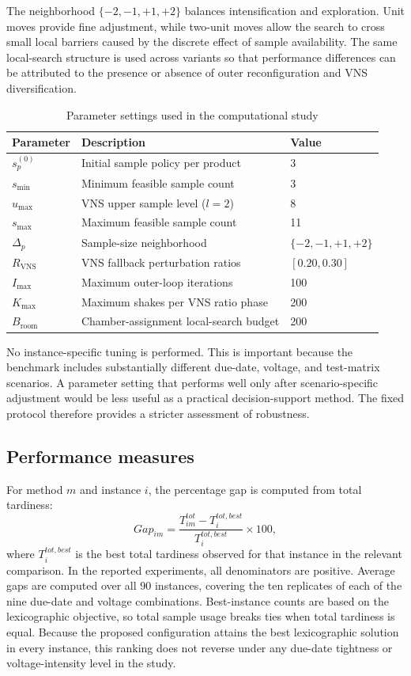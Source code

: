 \documentclass[11pt]{article}
\begin{document}
The neighborhood \(\{-2,-1,+1,+2\}\) balances intensification and exploration. Unit moves provide fine adjustment, while two-unit moves allow the search to cross small local barriers caused by the discrete effect of sample availability. The same local-search structure is used across variants so that performance differences can be attributed to the presence or absence of outer reconfiguration and VNS diversification.

\begin{table}[H]
\centering
\caption{Parameter settings used in the computational study}
\label{tab:param_settings_short}
\small
\begin{tabular}{lll}
\hline
\textbf{Parameter} & \textbf{Description} & \textbf{Value} \\
\hline
\(s_p^{(0)}\) & Initial sample policy per product & 3 \\
\(s_{\min}\) & Minimum feasible sample count & 3 \\
\(u_{\max}\) & VNS upper sample level (\(l=2\)) & 8 \\
\(s_{\max}\) & Maximum feasible sample count & 11 \\
\(\Delta_p\) & Sample-size neighborhood & \(\{-2,-1,+1,+2\}\) \\
\(R_{\mathrm{VNS}}\) & VNS fallback perturbation ratios & \([0.20,0.30]\) \\
\(I_{\max}\) & Maximum outer-loop iterations & 100 \\
\(K_{\max}\) & Maximum shakes per VNS ratio phase & 200 \\
\(B_{\mathrm{room}}\) & Chamber-assignment local-search budget & 200 \\
\hline
\end{tabular}
\end{table}

No instance-specific tuning is performed. This is important because the benchmark includes substantially different due-date, voltage, and test-matrix scenarios. A parameter setting that performs well only after scenario-specific adjustment would be less useful as a practical decision-support method. The fixed protocol therefore provides a stricter assessment of robustness.

\subsection{Performance measures}
\label{subsec:metrics}

For method \(m\) and instance \(i\), the percentage gap is computed from total tardiness:
\[
Gap_{im}=
\frac{T^{tot}_{im}-T^{tot,best}_{i}}
{T^{tot,best}_{i}}\times 100,
\]
where \(T^{tot,best}_{i}\) is the best total tardiness observed for that instance in the relevant comparison. In the reported experiments, all denominators are positive. Average gaps are computed over all 90 instances, covering the ten replicates of each of the nine due-date and voltage combinations. Best-instance counts are based on the lexicographic objective, so total sample usage breaks ties when total tardiness is equal. Because the proposed configuration attains the best lexicographic solution in every instance, this ranking does not reverse under any due-date tightness or voltage-intensity level in the study.
\end{document}
